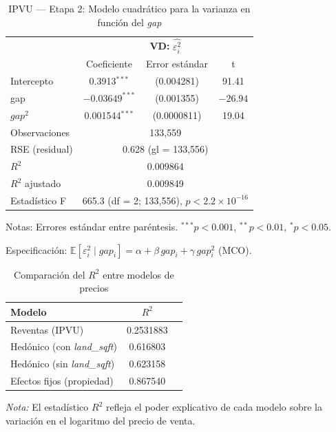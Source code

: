 \documentclass[conference]{IEEEtran}
\begin{document}
\begin{table}[H]
\centering
\caption{IPVU — Etapa 2: Modelo cuadrático para la varianza en función del \textit{gap}}
\begin{threeparttable}
\begin{tabular}{lccc}
\toprule
& \multicolumn{3}{c}{\textbf{VD: }$\widehat{\varepsilon_i^2}$} \\
\cmidrule(lr){2-4}
 & Coeficiente & Error estándar & t \\
\midrule
Intercepto      & 0.3913$^{***}$ & (0.004281) &  91.41 \\
gap             & $-0.03649^{***}$ & (0.001355) & $-26.94$ \\
$gap^{2}$       & 0.001544$^{***}$ & (0.0000811) &  19.04 \\
\midrule
Observaciones   & \multicolumn{3}{c}{133{,}559} \\
RSE (residual)  & \multicolumn{3}{c}{0.628 \quad (gl = 133{,}556)} \\
$R^{2}$         & \multicolumn{3}{c}{0.009864} \\
$R^{2}$ ajustado& \multicolumn{3}{c}{0.009849} \\
Estadístico F   & \multicolumn{3}{c}{665.3 \; (df = 2; 133{,}556), \; $p<2.2\times10^{-16}$} \\
\bottomrule
\end{tabular}
\begin{tablenotes}
\footnotesize
\item Notas: Errores estándar entre paréntesis. $^{***}p<0.001$, $^{**}p<0.01$, $^{*}p<0.05$.
\item Especificación: $\mathbb{E}[\varepsilon_i^2\mid gap_i]=\alpha+\beta\,gap_i+\gamma\,gap_i^2$ (MCO).
\end{tablenotes}
\end{threeparttable}
\end{table}

\begin{table}[H]
\centering
\caption{Comparación del $R^2$ entre modelos de precios}
\begin{threeparttable}
\begin{tabular}{lcc}
\toprule
\textbf{Modelo} & \textbf{$R^2$} \\
\midrule
Reventas (IPVU) & 0.2531883 \\
Hedónico (con \textit{land\_sqft}) & 0.616803 \\
Hedónico (sin \textit{land\_sqft}) & 0.623158 \\
Efectos fijos (propiedad) & 0.867540 \\
\bottomrule
\end{tabular}
\begin{tablenotes}
\footnotesize
\item \textit{Nota:} El estadístico $R^2$ refleja el poder explicativo de cada modelo sobre la variación en el logaritmo del precio de venta. 
\end{tablenotes}
\end{threeparttable}
\end{table}
\end{document}
